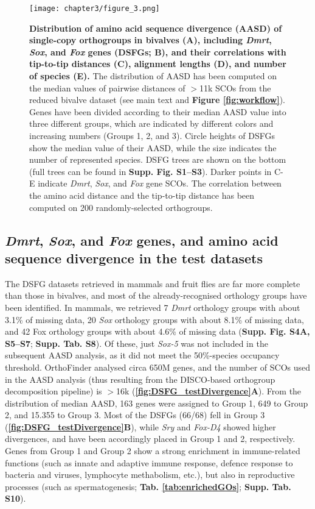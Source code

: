 \documentclass[../main.tex]{subfiles}
\begin{document}
\begin{figure}[]
    \centering
    \texttt{[image: chapter3/figure\_3.png]}
    \captionsetup{width=\textwidth}
    \caption{
    \textbf{Distribution of amino acid sequence divergence (AASD) of single-copy orthogroups in bivalves (A), including \textit{Dmrt}, \textit{Sox}, and \textit{Fox} genes (DSFGs; B), and their correlations with tip-to-tip distances (C), alignment lengths (D), and number of species (E).} The distribution of AASD has been computed on the median values of pairwise distances of $>$11k SCOs from the reduced bivalve dataset (see main text and \textbf{Figure \ref{fig:workflow}}). Genes have been divided according to their median AASD value into three different groups, which are indicated by different colors and increasing numbers (Groups 1, 2, and 3). Circle heights of DSFGs show the median value of their AASD, while the size indicates the number of represented species. DSFG trees are shown on the bottom (full trees can be found in \textbf{Supp. Fig. S1--S3}). Darker points in C-E indicate \textit{Dmrt}, \textit{Sox}, and \textit{Fox} gene SCOs. The correlation between the amino acid distance and the tip-to-tip distance has been computed on 200 randomly-selected orthogroups.
    }
    \label{fig:DSFG_bivalveDivergence}
\end{figure}

\subsection{\textit{Dmrt}, \textit{Sox}, and \textit{Fox} genes, and amino acid sequence divergence in the test datasets} \label{DSFG_test}
The DSFG datasets retrieved in mammals and fruit flies are far more complete than those in bivalves, and most of the already-recognised orthology groups have been identified.
In mammals, we retrieved 7 \textit{Dmrt} orthology groups with about 3.1\% of missing data, 20 \textit{Sox} orthology groups with about 8.1\% of missing data, and 42 Fox orthology groups with about 4.6\% of missing data (\textbf{Supp. Fig. S4A, S5--S7}; \textbf{Supp. Tab. S8}). Of these, just \textit{Sox-5} was not included in the subsequent AASD analysis, as it did not meet the 50\%-species occupancy threshold. OrthoFinder analysed circa 650M genes, and the number of SCOs used in the AASD analysis (thus resulting from the DISCO-based orthogroup decomposition pipeline) is $>$16k (\textbf{\ref{fig:DSFG_testDivergence}A}). From the distribution of median AASD, 163 genes were assigned to Group 1, 649 to Group 2, and 15.355 to Group 3. Most of the DSFGs (66/68) fell in Group 3 (\textbf{\ref{fig:DSFG_testDivergence}B}), while \textit{Sry} and \textit{Fox-D4} showed higher divergences, and have been accordingly placed in Group 1 and 2, respectively. Genes from Group 1 and Group 2 show a strong enrichment in immune-related functions (such as innate and adaptive immune response, defence response to bacteria and viruses, lymphocyte methabolism, etc.), but also in reproductive processes (such as  spermatogenesis; \textbf{Tab. \ref{tab:enrichedGOs}}; \textbf{Supp. Tab. S10}).
\end{document}
